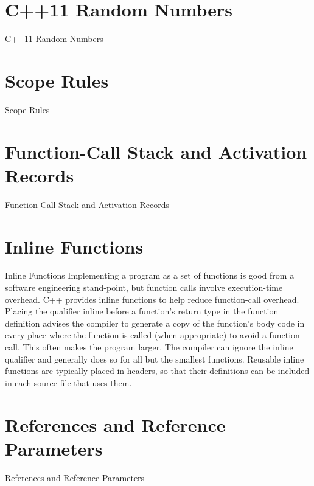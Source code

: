 \documentclass[10pt]{beamer}
\begin{document}
\section{C++11 Random Numbers}
\begin{frame}{C++11 Random Numbers}
	
\end{frame}

\section{Scope Rules}
\begin{frame}{Scope Rules}
	\lipsum[2]
\end{frame}

\section{Function-Call Stack and Activation Records}
\begin{frame}{Function-Call Stack and Activation Records}
	\lipsum[2]
\end{frame}

\section{Inline Functions}
\begin{frame}{Inline Functions}
	Implementing a program as a set of functions is good from a software engineering stand-point, but function calls involve execution-time overhead. C++ provides inline functions to
	help reduce function-call overhead. Placing the qualifier inline before a function’s return
	type in the function definition advises the compiler to generate a copy of the function’s body
	code in every place where the function is called (when appropriate) to avoid a function call.
	This often makes the program larger. The compiler can ignore the inline qualifier and generally does so for all but the smallest functions. Reusable inline functions are typically placed
	in headers, so that their definitions can be included in each source file that uses them.
\end{frame}

\section{References and Reference Parameters}
\begin{frame}{References and Reference Parameters}
	\lipsum[2]
\end{frame}
\end{document}

